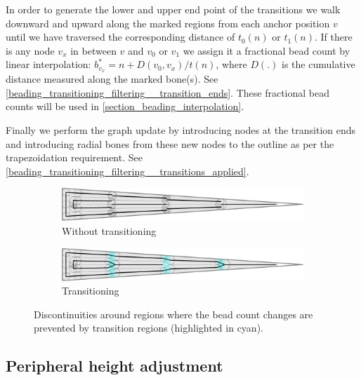 In order to generate the lower and upper end point of the transitions we walk downward and upward along the marked regions from each anchor position $v$ until we have traversed the corresponding distance of $t_{0}(n)$ or $t_{1}(n)$.
If there is any node $v_x$ in between $v$ and $v_0$ or $v_1$ we assign it a fractional bead count by linear interpolation: $b^*_{v_x} = n + D(v_0, v_x)/t(n)$, where $D(.)$ is the cumulative distance measured along the marked bone(s).
See \cref{beading_transitioning_filtering__transition_ends}.
These fractional bead counts will be used in \cref{section_beading_interpolation}.

Finally we perform the graph update by introducing nodes at the transition ends and introducing radial bones from these new nodes to the outline as per the trapezoidation requirement.
See \cref{beading_transitioning_filtering__transitions_applied}.


\begin{figure}
\centering
\setlength{\figwidth}{\columnwidth}
\begin{subfigure}{0.9\figwidth}
\includegraphics[width=\columnwidth]{sources/method/wedge_distributed_generated__no_transitions.pdf}
\caption{Without transitioning}
\end{subfigure}
\begin{subfigure}{0.9\figwidth}
\includegraphics[width=\columnwidth]{sources/method/wedge_distributed_generated.pdf}
\caption{Transitioning}
\end{subfigure}
\caption{
Discontinuities around regions where the bead count changes are prevented by transition regions (highlighted in cyan).
}
\label{transitions}
\end{figure}














\subsection{Peripheral height adjustment}\label{sec_peripheral_height_adjustment}

